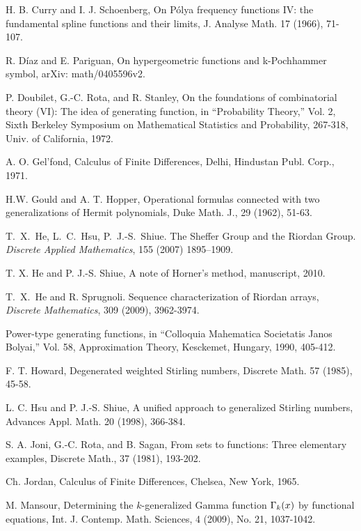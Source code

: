 \begin{thebibliography}{100}
H. B. Curry and I. J. Schoenberg, On P\'olya frequency functions IV: the fundamental spline functions and their limits, J. Analyse Math. 17 (1966), 71-107.

R. D\'iaz and E. Pariguan, On hypergeometric functions and k-Pochhammer symbol, arXiv: math/0405596v2.

P. Doubilet, G.-C. Rota, and R. Stanley, On the foundations of combinatorial theory (VI): The idea of generating function, in ``Probability Theory,'' Vol. 2, Sixth Berkeley Symposium on Mathematical Statistics and Probability, 267-318, Univ. of California, 1972.

A. O. Gel'fond, Calculus of Finite Differences,  Delhi, Hindustan Publ. Corp., 1971.

H.W. Gould and A. T. Hopper, Operational formulas connected with two generalizations of Hermit polynomials, Duke Math. J., 29 (1962), 51-63.

T.~X.~He, L.~C.~Hsu, P.~J.-S.~Shiue.
\newblock The Sheffer Group and the Riordan Group.
\newblock \emph{Discrete Applied Mathematics}, 155 (2007) 1895--1909.

T. X. He and P. J.-S. Shiue, A note of Horner's method, manuscript, 2010.

T.~X.~He and R. Sprugnoli. Sequence characterization of Riordan arrays, \newblock \emph{Discrete Mathematics}, 309 (2009), 3962-3974.

Power-type generating functions, in ``Colloquia Mahematica Societatis Janos Bolyai,'' Vol. 58, Approximation Theory, Kesckemet, Hungary, 1990, 405-412.

F. T. Howard, Degenerated weighted Stirling numbers, Discrete Math. 57 (1985), 45-58.

L. C. Hsu and P. J.-S. Shiue, A unified approach to generalized Stirling numbers, Advances Appl. Math. 20 (1998), 366-384.

S. A. Joni, G.-C. Rota, and B. Sagan, From sets to functions: Three elementary examples, Discrete Math., 37 (1981), 193-202.

Ch. Jordan, Calculus of Finite Differences, Chelsea, New York, 1965.

M. Mansour, Determining the $k$-generalized Gamma function ${\Gamma}_k(x)$ by functional equations, Int. J. Contemp. Math. Sciences, 4 (2009), No. 21, 1037-1042.


\end{thebibliography}

